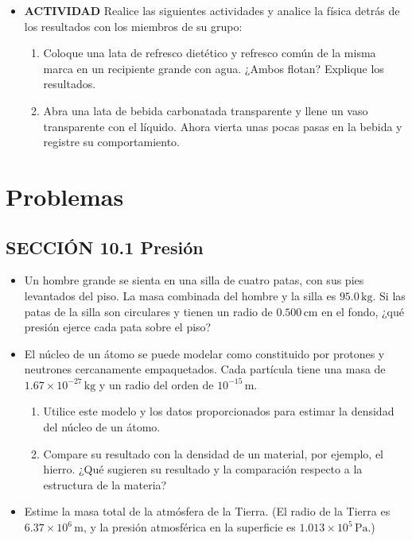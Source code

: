 \documentclass[11pt,a4paper]{article}
\begin{document}
\begin{itemize}
    \newpage

    \item[\textbf{3.}] \textbf{ACTIVIDAD} Realice las siguientes actividades y analice la física detrás de los resultados con los miembros de su grupo: 
    \begin{enumerate}
        \item Coloque una lata de refresco dietético y refresco común de la misma marca en un recipiente grande con agua. ¿Ambos flotan? Explique los resultados. 
        \item Abra una lata de bebida carbonatada transparente y llene un vaso transparente con el líquido. Ahora vierta unas pocas pasas en la bebida y registre su comportamiento.
    \end{enumerate}
    \vspace*{8cm}
\end{itemize}

\newpage

\section*{Problemas}

\subsection*{SECCIÓN 10.1 Presión}

\begin{itemize}
    \item[\textbf{1.}] Un hombre grande se sienta en una silla de cuatro patas, con sus pies levantados del piso. La masa combinada del hombre y la silla es \(95.0\,\text{kg}\). Si las patas de la silla son circulares y tienen un radio de \(0.500\,\text{cm}\) en el fondo, ¿qué presión ejerce cada pata sobre el piso?
    \vspace*{6cm}
    
    \item[\textbf{2.}] El núcleo de un átomo se puede modelar como constituido por protones y neutrones cercanamente empaquetados. Cada partícula tiene una masa de \(1.67 \times 10^{-27}\,\text{kg}\) y un radio del orden de \(10^{-15}\,\text{m}\).
    \begin{enumerate}
        \item Utilice este modelo y los datos proporcionados para estimar la densidad del núcleo de un átomo.
        \item Compare su resultado con la densidad de un material, por ejemplo, el hierro. ¿Qué sugieren su resultado y la comparación respecto a la estructura de la materia?
    \end{enumerate}
    \vspace*{7cm}
    
    \item[\textbf{3.}] Estime la masa total de la atmósfera de la Tierra. (El radio de la Tierra es \(6.37 \times 10^6\,\text{m}\), y la presión atmosférica en la superficie es \(1.013 \times 10^5\,\text{Pa}\).)
    \vspace*{6cm}
\end{itemize}
\end{document}
